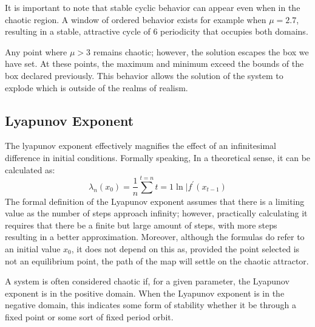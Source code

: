 \documentclass[]{article}
\begin{document}
		It is important to note that stable cyclic behavior can appear even when in the chaotic region. A window of ordered behavior exists for example when $\mu=2.7$, resulting in a stable, attractive cycle of 6 periodicity that occupies both domains.

		Any point where $\mu>3$ remains chaotic; however, the solution escapes the box we have set. At these points, the maximum and minimum exceed the bounds of the box declared previously. This behavior allows the solution of the system to explode which is outside of the realms of realism.
	\subsection*{Lyapunov Exponent}
		The lyapunov exponent effectively magnifies the effect of an infinitesimal difference in initial conditions. Formally speaking, In a theoretical sense, it can be calculated as:
		\begin{equation}
			\lambda_n(x_0)=\frac{1}{n}\sum^{t=n}{t=1}\ln|f^\prime(x_{t-1})
		\end{equation}
		The formal definition of the Lyapunov exponent assumes that there is a limiting value as the number of steps approach infinity; however, practically calculating it requires that there be a finite but large amount of steps, with more steps resulting in a better approximation. Moreover, although the formulas do refer to an initial value $x_0$, it does not depend on this as, provided the point selected is not an equilibrium point, the path of the map will settle on the chaotic attractor.

		A system is often considered chaotic if, for a given parameter, the Lyapunov exponent is in the positive domain. When the Lyapunov exponent is in the negative domain, this indicates some form of stability whether it be through a fixed point or some sort of fixed period orbit.
\end{document}
